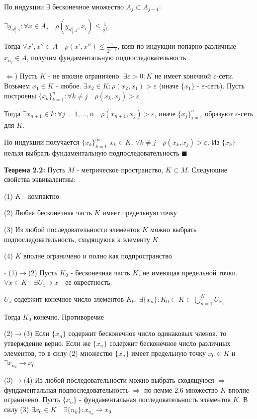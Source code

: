 \documentclass[a4paper]{report}
\begin{document}
По индукции $\exists$ бесконечное множество $A_j\subset A_{j-1}\colon$ 

$\exists y_{n_j^0,i}\colon\forall x\in A_j\quad
\rho(y_{n_j^0,j},x_i)\le\displaystyle\frac{1}{2^j}$

Тогда $\forall x',x''\in A\quad\rho(x',x'')\le\displaystyle\frac{1}{2^{i-1}}$, взяв по индукции попарно различные $x_{n_j}\in A$, 
получим фундаментальную подпоследовательность

$\Leftarrow$) Пусть $K$ - не вполне ограничено. $\exists\varepsilon>0\colon K$ не имеет конечной $\varepsilon$-сети. 
Возьмем $x_1\in K$ - любое. $\exists x_2\in K\colon\rho(x_2,x_1)>\varepsilon$ (иначе $\{x_1\}$ - $\varepsilon$-сеть). 
Пусть построены $\{x_k\}_{k=1}^n\colon\forall k\ne j\quad\rho(x_k,x_j)>\varepsilon$

Тогда $\exists x_{n+1}\in k\colon\forall j=1,\ldots,n\quad\rho(x_{n+1},x_j)>\varepsilon$, иначе $\{x_j\}_{j=1}^n$ образуют
$\varepsilon$-сеть для $K$. 

По индукции получается $\{x_k\}_{k=1}^\infty$ $x_k\in K$, $\forall k\ne j\quad\rho(x_k,x_j)>\varepsilon$. Из $\{x_k\}$ 
нельзя выбрать фундаментальную подпоследовательность $\blacksquare$
\bigskip

\noindent\textbf{Теорема 2.2:} Пусть $M$ - метрическое пространство, $K\subset M$. Следующие свойства эквивалентны:

(1) $K$ - компактно

(2) Любая бесконечная часть $K$ имеет предельную точку

(3) Из любой последовательности элементов $K$ можно выбрать подпоследовательность, сходящуюся к элементу $K$

(4) $K$ вполне ограничено и полно как подпространство

\noindent $\square$ (1)$\to$(2) Пусть $K_0$ - бесконечная часть $K$, не имеющая предельной точки. $\forall x\in K\quad
\exists U_x\ni x$ - ее окрестность: 

$U_x$ содержит конечное число элементов $K_0$. $\exists\{x_n\}\colon K_0\subset K\subset\bigcup\limits_{n=1}^N U_{x_n}$

Тогда $K_0$ конечно. Противоречие

(2)$\to$(3) Если $\{x_n\}$ содержит бесконечное число одинаковых членов, то утверждение верно. Если же $\{x_n\}$ содержит 
бесконечное число различных элементов, то в силу (2) множество $\{x_n\}$ имеет предельную точку $x_0\in K$ и $\exists
x_{n_k}\to x_0$

(3)$\to$(4) Из любой последовательности можно выбрать сходящуюся $\Rightarrow$ фундаментальная подпоследовательность 
$\Rightarrow$ по лемме 2.6 множество $K$ вполне ограничено. Пусть $\{x_n\}$ - фундаментальная последовательность элементов 
$K$. В силу (3) $\exists x_0\in K\quad\exists\{n_k\}\colon x_{n_k}\to x_0$
\end{document}
